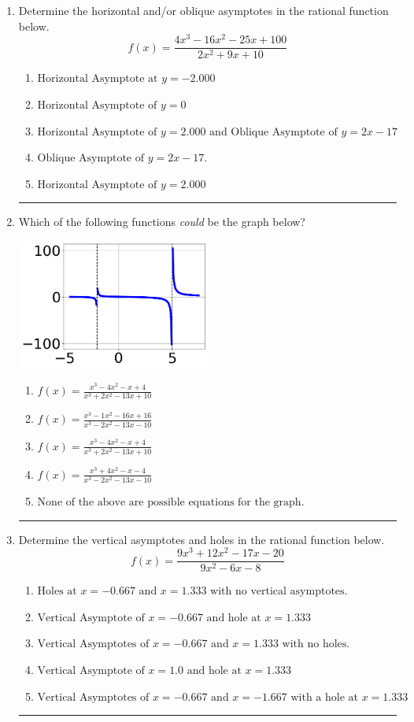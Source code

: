 \documentclass[14pt]{extbook}
\newcommand{\litem}[1]{\item#1\hspace*{-1cm}\rule{\textwidth}{0.4pt}}
\begin{document}
\begin{enumerate}
\litem{
Determine the horizontal and/or oblique asymptotes in the rational function below.\[ f(x) = \frac{4x^{3} -16 x^{2} -25 x + 100}{2x^{2} +9 x + 10} \]\begin{enumerate}[label=\Alph*.]
\item \( \text{Horizontal Asymptote at } y = -2.000 \)
\item \( \text{Horizontal Asymptote of } y = 0 \)
\item \( \text{Horizontal Asymptote of } y = 2.000 \text{ and Oblique Asymptote of } y = 2x -17 \)
\item \( \text{Oblique Asymptote of } y = 2x -17. \)
\item \( \text{Horizontal Asymptote of } y = 2.000  \)

\end{enumerate} }
\litem{
Which of the following functions \textit{could} be the graph below?
\begin{center}
    \includegraphics[width=0.5\textwidth]{../Figures/identifyGraphOfRationalFunctionCopyB.png}
\end{center}
\begin{enumerate}[label=\Alph*.]
\item \( f(x)=\frac{x^{3} -4 x^{2} -x + 4}{x^{3} +2 x^{2} -13 x + 10} \)
\item \( f(x)=\frac{x^{3} -1 x^{2} -16 x + 16}{x^{3} -2 x^{2} -13 x -10} \)
\item \( f(x)=\frac{x^{3} -4 x^{2} -x + 4}{x^{3} +2 x^{2} -13 x + 10} \)
\item \( f(x)=\frac{x^{3} +4 x^{2} -x -4}{x^{3} -2 x^{2} -13 x -10} \)
\item \( \text{None of the above are possible equations for the graph.} \)

\end{enumerate} }
\litem{
Determine the vertical asymptotes and holes in the rational function below.\[ f(x) = \frac{9x^{3} +12 x^{2} -17 x -20}{9x^{2} -6 x -8} \]\begin{enumerate}[label=\Alph*.]
\item \( \text{Holes at } x = -0.667 \text{ and } x = 1.333 \text{ with no vertical asymptotes.} \)
\item \( \text{Vertical Asymptote of } x = -0.667 \text{ and hole at } x = 1.333 \)
\item \( \text{Vertical Asymptotes of } x = -0.667 \text{ and } x = 1.333 \text{ with no holes.} \)
\item \( \text{Vertical Asymptote of } x = 1.0 \text{ and hole at } x = 1.333 \)
\item \( \text{Vertical Asymptotes of } x = -0.667 \text{ and } x = -1.667 \text{ with a hole at } x = 1.333 \)


\end{enumerate}}
\end{enumerate}
\end{document}
